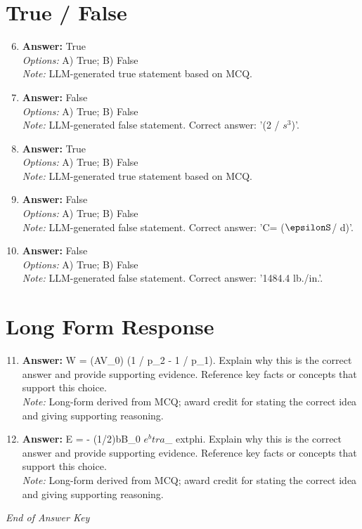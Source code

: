 \documentclass[12pt]{article}
\begin{document}
\section*{True / False}
\begin{enumerate}[label=\arabic*.]
\setcounter{enumi}{5}
\item \textbf{Answer:} True
\\ \textit{Options:} A) True; B) False
\\ \textit{Note:} LLM-generated true statement based on MCQ.
\item \textbf{Answer:} False
\\ \textit{Options:} A) True; B) False
\\ \textit{Note:} LLM-generated false statement. Correct answer: '(2 / $s^3$)'.
\item \textbf{Answer:} True
\\ \textit{Options:} A) True; B) False
\\ \textit{Note:} LLM-generated true statement based on MCQ.
\item \textbf{Answer:} False
\\ \textit{Options:} A) True; B) False
\\ \textit{Note:} LLM-generated false statement. Correct answer: 'C= (\ensuremath{\epsilonS}/ d)'.
\item \textbf{Answer:} False
\\ \textit{Options:} A) True; B) False
\\ \textit{Note:} LLM-generated false statement. Correct answer: '1484.4 lb./in.'.
\end{enumerate}

\section*{Long Form Response}
\begin{enumerate}[label=\arabic*.]
\setcounter{enumi}{10}
\item \textbf{Answer:} W = (AV\_0) (1 / p\_2 - 1 / p\_1). Explain why this is the correct answer and provide supporting evidence. Reference key facts or concepts that support this choice.
\\ \textit{Note:} Long-form derived from MCQ; award credit for stating the correct idea and giving supporting reasoning.
\item \textbf{Answer:} E = - (1/2)bB\_0 $e^btra$\_ extphi. Explain why this is the correct answer and provide supporting evidence. Reference key facts or concepts that support this choice.
\\ \textit{Note:} Long-form derived from MCQ; award credit for stating the correct idea and giving supporting reasoning.
\end{enumerate}

\vfill
\noindent\textit{End of Answer Key}
\end{document}
